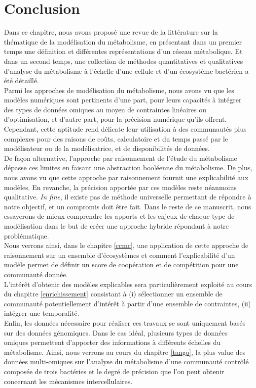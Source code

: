 \documentclass[../main.tex]{subfiles}
\begin{document}
\section*{Conclusion}
Dans ce chapitre, nous avons proposé une revue de la littérature sur la thématique de la modélisation du métabolisme, en présentant dans un premier temps une définition et différentes représentations d'un réseau métabolique. Et dans un second temps, une collection de méthodes quantitatives et qualitatives d'analyse du métabolisme à l'échelle d'une cellule et d'un écosystème bactérien a été détaillé.\\
Parmi les approches de modélisation du métabolisme, nous avons vu que les modèles numériques sont pertinents d'une part, pour leurs capacités à intégrer des types de données omiques au moyen de contraintes linéaires ou d'optimisation, et d'autre part, pour la précision numérique qu'ils offrent. Cependant, cette aptitude rend délicate leur utilisation à des communautés plus complexes pour des raisons de coûts, calculatoire et du temps passé par le modélisateur ou de la modélisatrice, et de disponibilités de données. \\
De façon alternative, l'approche par raisonnement de l'étude du métabolisme dépasse ces limites en faisant une abstraction booléenne du métabolisme. De plus, nous avons vu que cette approche par raisonnement fournit une explicabilité aux modèles. En revanche, la précision apportée par ces modèles reste néanmoins qualitative. \textit{In fine}, il existe pas de méthode universelle permettant de répondre à notre objectif, et un compromis doit être fait. Dans le reste de ce manuscrit, nous essayerons de mieux comprendre les apports et les enjeux de chaque type de modélisation dans le but de créer une approche hybride répondant à notre problématique.\\
Nous verrons ainsi, dans le chapitre \ref{ccmc}, une application de cette approche de raisonnement sur un ensemble d'écosystèmes et comment l'explicabilité d'un modèle permet de définir un score de coopération et de compétition pour une communauté donnée. \\
L'intérêt d'obtenir des modèles explicables sera particulièrement exploité au cours du chapitre \ref{enrichissement} consistant à (i) sélectionner un ensemble de communauté potentiellement d'intérêt à partir d'une ensemble de contraintes, (ii) intégrer une temporalité. \\
Enfin, les données nécessaire pour réaliser ces travaux se sont uniquement basés sur des données génomiques. Dans le cas idéal, plusieurs types de données omiques permettent d'apporter des informations à différents échelles du métabolisme. Ainsi, nous verrons au cours du chapitre \ref{tango}, la plus value des données multi-omiques sur l'analyse du métabolisme d'une communauté contrôlé composée de trois bactéries et le degré de précision que l'on peut obtenir concernant les mécanismes intercellulaires.
\end{document}
